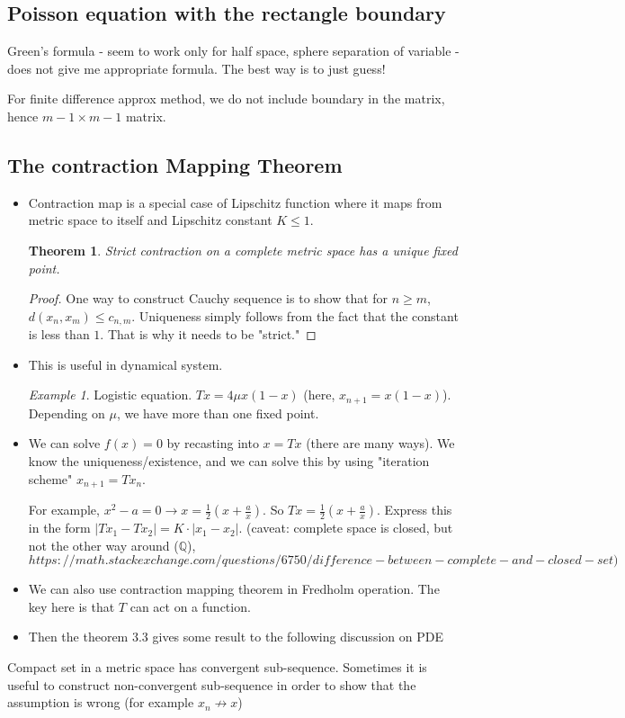 \documentclass{article}
\newtheorem{theorem}{Theorem}
\theoremstyle{remark}
\newtheorem{example}{Example}
\begin{document}
\subsection*{Poisson equation with the rectangle boundary}
Green's formula - seem to work only for half space, sphere
separation of variable - does not give me appropriate formula. The best way is to just guess!

For finite difference approx method, we do not include boundary in the matrix, hence $m-1\times m-1$ matrix.








\subsection*{The contraction Mapping Theorem}
\begin{itemize}
\item Contraction map is a special case of Lipschitz function where it maps from metric space to itself and Lipschitz constant $K\leq 1$.
\begin{theorem}
Strict contraction on a complete metric space has a unique fixed point.
\end{theorem}
\begin{proof}
One way to construct Cauchy sequence is to show that for $n\geq m$, $d(x_n,x_m)\leq c_{n,m}$. Uniqueness simply follows from the fact that the constant is less than $1$. That is why it needs to be "strict."
\end{proof}
\item This is useful in dynamical system. 
\begin{example}
Logistic equation. $Tx=4\mu x(1-x)$ (here, $x_{n+1}=x(1-x)$). Depending on $\mu$, we have more than one fixed point.
\end{example}
\item
We can solve $f(x)=0$ by recasting into $x=Tx$ (there are many ways). We know the uniqueness/existence, and we can solve this by using "iteration scheme" $x_{n+1}=Tx_n$.

For example, $x^2-a=0\to x=\frac 12(x+\frac ax)$. So $Tx=\frac 12(x+\frac ax)$. Express this in the form $\lvert Tx_1-Tx_2\rvert =K\cdot\lvert x_1-x_2\rvert$. (caveat: complete space is closed, but not the other way around ($\mathbb{Q}$), $https://math.stackexchange.com/questions/6750/difference-between-complete-and-closed-set)$


\item We can also use contraction mapping theorem in Fredholm operation. The key here is that $T$ can act on a function.
\item Then the theorem 3.3 gives some result to the following discussion on PDE
\end{itemize}

Compact set in a metric space has convergent sub-sequence. Sometimes it is useful to construct non-convergent sub-sequence in order to show that the assumption is wrong (for example $x_n\not\to x$)
\end{document}
